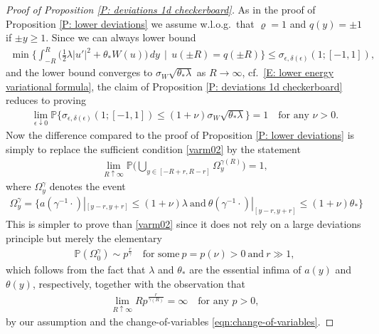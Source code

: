 \documentclass[10pt,a4paper]{amsart}
\begin{document}
\begin{proof}[Proof of Proposition \ref{P: deviations 1d checkerboard}]
	As in the proof of Proposition \ref{P: lower deviations} we assume w.l.o.g.~that $ \varrho = 1 $ and $ q ( y ) = \pm 1 $ if $ \pm y \geq 1 $. Since we can always lower bound
	\begin{align*}
		\min \Big\{ \int_{-R}^{R} \Big( \frac{1}{2}\lambda |u'|^{2} + \theta_{*} W(u) \Big) \, dy \, \mid \, u(\pm R) = q(\pm R) \Big\}
		\leq \sigma_{ \epsilon, \delta ( \epsilon ) } ( 1; [ - 1, 1 ] ) ,
	\end{align*}
	and the lower bound converges to $  \sigma_{W} \sqrt{ \theta_{*} \lambda } $ as $ R \rightarrow \infty $, cf.~\eqref{E: lower energy variational formula}, the claim of Proposition \ref{P: deviations 1d checkerboard} reduces to proving
	\begin{align*}
		\lim_{ \epsilon \downarrow 0 } \mathbb{P} \big\{ \sigma_{ \epsilon, \delta ( \epsilon ) } ( 1 ; [ - 1, 1 ] ) \leq ( 1 + \nu ) \sigma_{W} \sqrt{ \theta_{*} \lambda } \big\} = 1
		\quad \text{for any } \nu > 0 .
	\end{align*}
	Now the difference compared to the proof of Proposition \ref{P: lower deviations} is simply to replace the sufficient condition \eqref{varm02} by the statement
	\begin{align}
		\lim_{ R \uparrow \infty } \mathbb{P} \big( \bigcup_{ y \in [ -R + r, R - r ] } \Omega_y^{ \gamma(R) }  \big) = 1 ,
	\end{align}
    where $ \Omega_y^{ \gamma } $ denotes the event
    \begin{align*}
        \Omega_{ y }^{ \gamma } = \{  a ( \gamma^{-1} \cdot ) |_ { [ y - r , y + r ] } \leq ( 1 + \nu ) \lambda ~ \text{and} ~ \theta ( \gamma^{-1} \cdot ) |_ { [ y - r , y + r ] } \leq ( 1 + \nu )  \theta_* \}
    \end{align*}
	This is simpler to prove than \eqref{varm02} since it does not rely on a large deviations principle but merely the elementary
	\begin{align}
		\mathbb{P} (  \Omega_0^{ \gamma } )
		\sim p^{ \frac{ r }{ \gamma } }
		\quad \text{for~some} ~ p = p(\nu) > 0 ~ \text{and} ~ r \gg 1,
	\end{align}
	which follows from the fact that $\lambda$ and $\theta_{*}$ are the essential infima of $a(y)$ and $\theta(y)$, respectively,
	together with the observation that
	\begin{align}
		\lim_{ R \uparrow \infty } R p^{ \frac{ r }{ \gamma(R) } } = \infty 
		\quad \text{for~any } p > 0,
	\end{align}
	by our assumption and the change-of-variables \eqref{eqn:change-of-variables}.
\end{proof}
\end{document}
